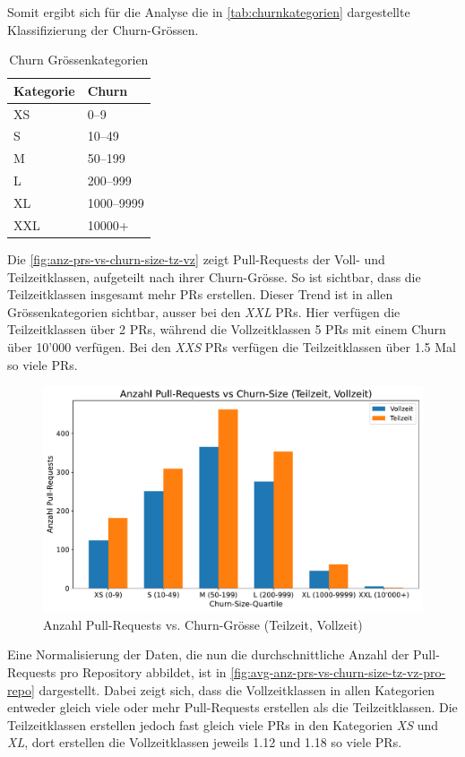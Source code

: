 \newpage
Somit ergibt sich für die Analyse die in \autoref{tab:churnkategorien} dargestellte Klassifizierung der Churn-Grössen.
\begin{table}[ht]
\caption{Churn Grössenkategorien}
\label{tab:churnkategorien}
\centering
\begin{tabular}{l l}
\toprule
\textbf{Kategorie} & \textbf{Churn} \\
\midrule
XS  & 0--9       \\
S        & 10--49     \\
M        & 50--199    \\
L         & 200--999   \\
XL   & 1000--9999 \\
XXL  & 10000+ \\
\bottomrule
\end{tabular}
\end{table}


Die \autoref{fig:anz-prs-vs-churn-size-tz-vz} zeigt Pull-Requests der Voll- und Teilzeitklassen, aufgeteilt nach ihrer Churn-Grösse. So ist sichtbar, dass die Teilzeitklassen insgesamt mehr PRs erstellen. Dieser Trend ist in allen Grössenkategorien sichtbar, ausser bei den \textit{XXL} PRs. Hier verfügen die Teilzeitklassen  über 2 PRs, während die Vollzeitklassen 5 PRs mit einem Churn über 10'000 verfügen. Bei den \textit{XXS} PRs verfügen die Teilzeitklassen über 1.5 Mal so viele PRs.

\begin{figure}[htbp]
    \includegraphics[width=\textwidth]{Figures/anz-prs-vs-churn-size-tz-vz.pdf}
    \caption{Anzahl Pull-Requests vs. Churn-Grösse (Teilzeit, Vollzeit)}
    \label{fig:anz-prs-vs-churn-size-tz-vz}
\end{figure}
\newpage
Eine Normalisierung der Daten, die nun die durchschnittliche Anzahl der Pull-Requests pro Repository abbildet, ist in \autoref{fig:avg-anz-prs-vs-churn-size-tz-vz-pro-repo} dargestellt. Dabei zeigt sich, dass die Vollzeitklassen in allen Kategorien entweder gleich viele oder mehr Pull-Requests erstellen als die Teilzeitklassen. Die Teilzeitklassen erstellen jedoch fast gleich viele PRs in den Kategorien \textit{XS} und \textit{XL}, dort erstellen die Vollzeitklassen jeweils 1.12 und 1.18 so viele PRs. 

